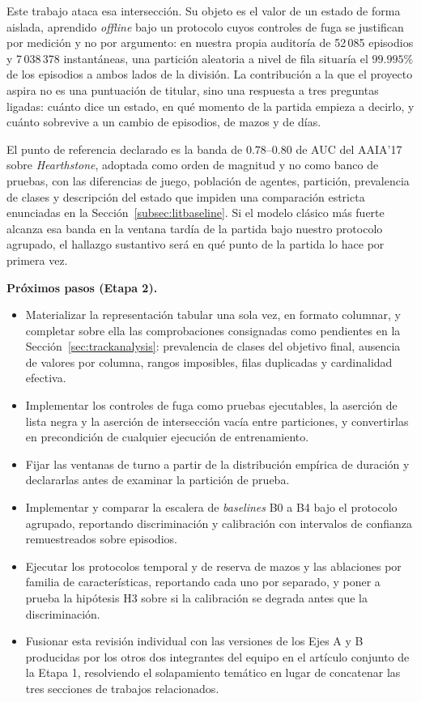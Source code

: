 \documentclass[conference]{IEEEtran}
\begin{document}
Este trabajo ataca esa intersecci\'on. Su objeto es el valor de un estado de
forma aislada, aprendido \emph{offline} bajo un protocolo cuyos controles de
fuga se justifican por medici\'on y no por argumento: en nuestra propia
auditor\'ia de 52\,085 episodios y 7\,038\,378 instant\'aneas, una
partici\'on aleatoria a nivel de fila situar\'ia el $99.995\%$ de los
episodios a ambos lados de la divisi\'on. La contribuci\'on a la que el
proyecto aspira no es una puntuaci\'on de titular, sino una respuesta a tres
preguntas ligadas: cu\'anto dice un estado, en qu\'e momento de la partida
empieza a decirlo, y cu\'anto sobrevive a un cambio de episodios, de mazos y
de d\'ias.

El punto de referencia declarado es la banda de $0.78$--$0.80$ de AUC del
AAIA'17 sobre \emph{Hearthstone}, adoptada como orden de magnitud y no como
banco de pruebas, con las diferencias de juego, poblaci\'on de agentes,
partici\'on, prevalencia de clases y descripci\'on del estado que impiden una
comparaci\'on estricta enunciadas en la
Secci\'on~\ref{subsec:litbaseline}. Si el modelo cl\'asico m\'as fuerte
alcanza esa banda en la ventana tard\'ia de la partida bajo nuestro protocolo
agrupado, el hallazgo sustantivo ser\'a en qu\'e punto de la partida lo hace
por primera vez.

\noindent\textbf{Pr\'oximos pasos (Etapa 2).}
\begin{itemize}
  \item Materializar la representaci\'on tabular una sola vez, en formato
        columnar, y completar sobre ella las comprobaciones consignadas como
        pendientes en la Secci\'on~\ref{sec:trackanalysis}: prevalencia de
        clases del objetivo final, ausencia de valores por columna, rangos
        imposibles, filas duplicadas y cardinalidad efectiva.
  \item Implementar los controles de fuga como pruebas ejecutables, la
        aserci\'on de lista negra y la aserci\'on de intersecci\'on vac\'ia
        entre particiones, y convertirlas en precondici\'on de cualquier
        ejecuci\'on de entrenamiento.
  \item Fijar las ventanas de turno a partir de la distribuci\'on emp\'irica
        de duraci\'on y declararlas antes de examinar la partici\'on de
        prueba.
  \item Implementar y comparar la escalera de \emph{baselines} B0 a B4 bajo
        el protocolo agrupado, reportando discriminaci\'on y calibraci\'on
        con intervalos de confianza remuestreados sobre episodios.
  \item Ejecutar los protocolos temporal y de reserva de mazos y las
        ablaciones por familia de caracter\'isticas, reportando cada uno por
        separado, y poner a prueba la hip\'otesis H3 sobre si la
        calibraci\'on se degrada antes que la discriminaci\'on.
  \item Fusionar esta revisi\'on individual con las versiones de los Ejes A y
        B producidas por los otros dos integrantes del equipo en el
        art\'iculo conjunto de la Etapa 1, resolviendo el solapamiento
        tem\'atico en lugar de concatenar las tres secciones de trabajos
        relacionados.
\end{itemize}



\end{document}
